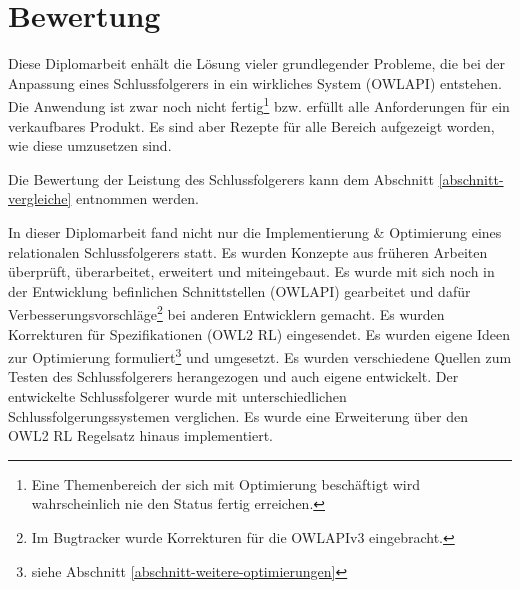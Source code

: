 \chapter{Bewertung}
Diese Diplomarbeit enhält die Lösung vieler grundlegender Probleme, die bei der Anpassung eines Schlussfolgerers in ein wirkliches System (OWLAPI) entstehen. Die Anwendung ist zwar noch nicht fertig\footnote{Eine Themenbereich der sich mit Optimierung beschäftigt wird wahrscheinlich nie den Status fertig erreichen.} bzw. erfüllt alle Anforderungen für ein verkaufbares Produkt. Es sind aber Rezepte für alle Bereich aufgezeigt worden, wie diese umzusetzen sind.

Die Bewertung der Leistung des Schlussfolgerers kann dem Abschnitt \ref{abschnitt-vergleiche} entnommen werden.

In dieser Diplomarbeit fand nicht nur die Implementierung & Optimierung eines relationalen Schlussfolgerers statt. Es wurden Konzepte aus früheren Arbeiten überprüft, überarbeitet, erweitert und miteingebaut. Es wurde mit sich noch in der Entwicklung befinlichen Schnittstellen (OWLAPI) gearbeitet und dafür Verbesserungsvorschläge\footnote{Im Bugtracker wurde Korrekturen für die OWLAPIv3 eingebracht.} bei anderen Entwicklern gemacht. Es wurden Korrekturen für Spezifikationen (OWL2 RL) eingesendet. Es wurden eigene Ideen zur Optimierung formuliert\footnote{siehe Abschnitt \ref{abschnitt-weitere-optimierungen}} und umgesetzt. Es wurden verschiedene Quellen zum Testen des Schlussfolgerers herangezogen und auch eigene entwickelt. Der entwickelte Schlussfolgerer wurde mit unterschiedlichen Schlussfolgerungssystemen verglichen. Es wurde eine Erweiterung über den OWL2 RL Regelsatz hinaus implementiert.

